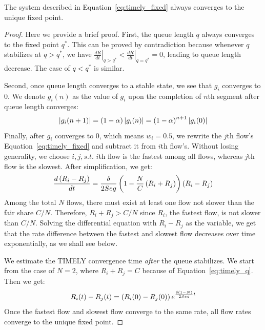 \begin{thm}
The system described in Equation~\ref{eq:timely_fixed} always converges to the unique fixed point.
\end{thm}
\begin{proof}
Here we provide a brief proof. First, the queue length $q$ always
converges to the fixed point $q^*$. This can be proved by contradiction because whenever $q$ stabilizes
at $q>q^*$, we have ${\left. {\frac{{dR}}{{dt}}} \right|_{q > {q^*}}} < {\left. {\frac{{dR}}{{dt}}} \right|_{q = {q^*}}} = 0$, 
leading to queue length decrease. The case of $q<q^*$ is similar. 

Second, once queue length converges to a stable state, we see that $g_i$ converges to 0.
We denote ${g_i}(n)$ as the value of $g_i$ upon the completion of $n$th segment after queue
length converges:
\begin{equation}
\small
\left| {{g_i}(n + 1)} \right| = \left( {1 - \alpha} \right)\left| {{g_i}(n)} \right| = {\left( {1 - \alpha} \right)}^{n+1} \left| {{g_i}(0)} \right|
\end{equation}
Finally, after $g_i$ converges to 0, which means $w_i=0.5$, we rewrite the $j$th flow's Equation~\ref{eq:timely_fixed} 
and subtract it from $i$th flow's. Without losing generality, we choose $i,j, s.t.$ $i$th flow is the fastest among all flows,
whereas $j$th flow is the slowest. After simplification, we get:
\begin{equation}
\small
\frac{{d\left( {{R_i} - {R_j}} \right)}}{{dt}} = \frac{\delta }{{2Seg}}\left( {1 - \frac{N}{C}\left( {{R_i} + {R_j}} \right)} \right)\left( {{R_i} - {R_j}} \right)
\end{equation}
Among the total $N$ flows, there must exist at least one flow not slower than the fair share $C/N$.
Therefore, ${{R_i} + {R_j}} > C/N$ since $R_i$, the fastest flow, is not slower than $C/N$.
Solving the differential equation with ${{R_i} - {R_j}}$ as the variable, we get that the rate 
difference between the fastest and slowest flow decreases over time exponentially, as we shall see below. 

 We estimate the TIMELY convergence time {\em after}
the queue stabilizes. We start from the case of $N=2$, where $R_i + R_j = C$
because of Equation~\ref{eq:timely_q}.
Then we get:
\begin{equation}
\small
{R_i}(t) - {R_j}(t) = \left( {{R_i}(0) - {R_j}(0)} \right){e^{\frac{{\delta (1 - N)}}{{2Seg}}t}}
\end{equation}
Once the fastest flow and slowest flow converge to the same rate, all flow rates converge to the unique fixed point.
\end{proof}

